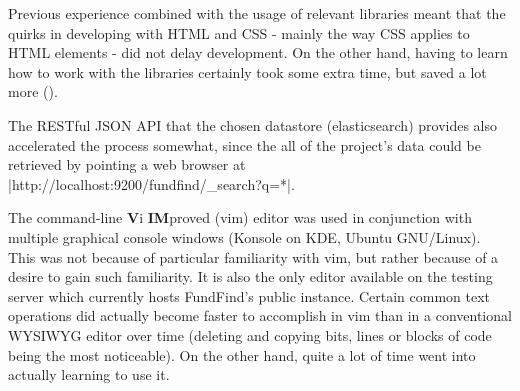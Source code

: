 Previous experience combined with the usage of relevant libraries meant that the quirks in developing with HTML and CSS - mainly the way CSS applies to HTML elements - did not delay development. On the other hand, having to learn how to work with the libraries certainly took some extra time, but saved a lot more ().

The RESTful JSON API that the chosen datastore (elasticsearch) provides also accelerated the process somewhat, since the all of the project's data could be retrieved by pointing a web browser at
\\ |http://localhost:9200/fundfind/_search?q=*|.

The command-line \textbf{V}i \textbf{IM}proved (vim) editor was used in conjunction with multiple graphical console windows (Konsole on KDE, Ubuntu GNU/Linux). This was not because of particular familiarity with vim, but rather because of a desire to gain such familiarity. It is also the only editor available on the testing server which currently hosts FundFind's public instance. Certain common text operations did actually become faster to accomplish in vim than in a conventional WYSIWYG editor over time (deleting and copying bits, lines or blocks of code being the most noticeable). On the other hand, quite a lot of time went into actually learning to use it.